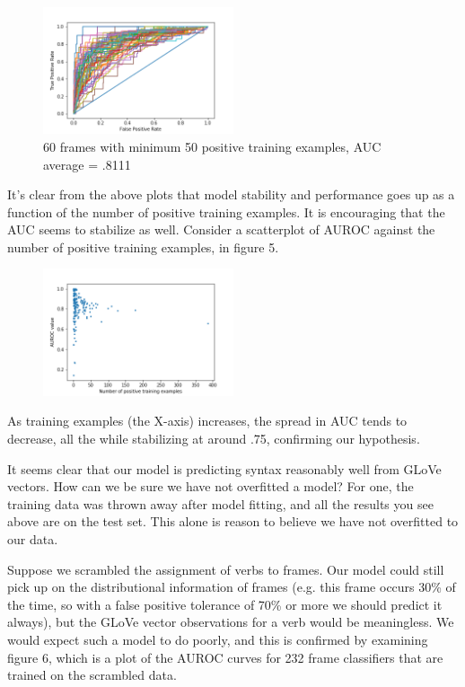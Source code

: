 \documentclass[a4paper]{article}
\begin{document}
\begin{figure}
\centering
\includegraphics[width=0.5\textwidth]{auc_plot50.png}
\caption{\label{fig:frog} 60 frames with minimum 50 positive training examples, AUC average = .8111}
\end{figure}

It's clear from the above plots that model stability and performance goes up as a function of the number of positive training examples. It is encouraging that the AUC seems to stabilize as well. Consider a scatterplot of AUROC against the number of positive training examples, in figure 5.

\begin{figure}
\centering
\includegraphics[width=0.5\textwidth]{auc_scatter5.png}
\caption{\label{fig:frog} }
\end{figure}

As training examples (the X-axis) increases, the spread in AUC tends to decrease, all the while stabilizing at around .75, confirming our hypothesis.

It seems clear that our model is predicting syntax reasonably well from GLoVe vectors. How can we be sure we have not overfitted a model? For one, the training data was thrown away after model fitting, and all the results you see above are on the test set. This alone is reason to believe we have not overfitted to our data.

Suppose we scrambled the assignment of verbs to frames. Our model could still pick up on the distributional information of frames (e.g. this frame occurs 30\% of the time, so with a false positive tolerance of 70\% or more we should predict it always), but the GLoVe vector observations for a verb would be meaningless. We would expect such a model to do poorly, and this is confirmed by examining figure 6, which is a plot of the AUROC curves for 232 frame classifiers that are trained on the scrambled data.
\end{document}
